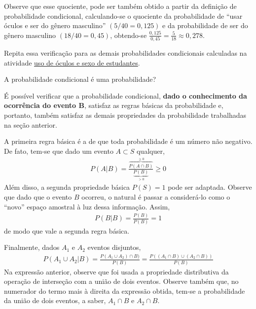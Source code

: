 Observe que esse quociente, pode ser também obtido a partir da definição de probabilidade condicional, calculando-se o quociente da probabilidade de “usar óculos e ser do gênero masculino”{} $(5/40=0{,}125)$ e da probabilidade de ser do gênero masculino $(18/40=0{,}45)$, obtendo-se \(\displaystyle{\frac{0,125}{0,45}=\frac{5}{18}\approx 0{,}278}\).

Repita essa verificação para as demais probabilidades condicionais calculadas na atividade \hyperref[uso-oculos]{uso de óculos e sexo de estudantes}.

\begin{example} {A probabilidade condicional é uma probabilidade?}

É possível verificar que a probabilidade condicional, \textbf{dado o conhecimento da ocorrência do evento B}, satisfaz as regras básicas da probabilidade e, portanto, também satisfaz as demais propriedades da probabilidade trabalhadas na seção anterior.

A primeira regra básica é a de que toda probabilidade é um número não negativo. De fato, tem-se que dado um evento \(A\subset S\) qualquer,
\begin{equation*}
\begin{split}P(A|B)=\frac{\overbrace{P(A\cap B)}^{\geq 0}}{\underbrace{P(B)}_{>0}}\geq 0\end{split}
\end{equation*}
Além disso, a segunda propriedade básica \(P(S)=1\) pode ser adaptada.  Observe que dado que o evento \(B\) ocorreu, o natural é passar a considerá-lo como o “novo”{} espaço amostral à luz dessa informação. Assim,
\begin{equation*}
\begin{split}P(B|B)=\frac{P(B)}{P(B)}=1\end{split}
\end{equation*}
de modo que vale a segunda regra básica.

Finalmente, dados \(A_1\) e \(A_2\)  eventos disjuntos,
\begin{equation*}
\begin{split}P(A_1\cup A_2|B)=\frac{P(A_1\cup A_2)\cap B)}{P(B)}=\frac{P((A_1\cap B)\cup(A_2\cap B))}{P(B)}\end{split}
\end{equation*}
Na expressão anterior, observe que foi usada a propriedade distributiva da operação de interseção com a união de dois eventos. Observe também que, no numerador do termo mais à direita da expressão obtida, tem-se a probabilidade da união de dois eventos, a saber, \(A_1\cap B\) e \(A_2\cap B\).


\end{example}
